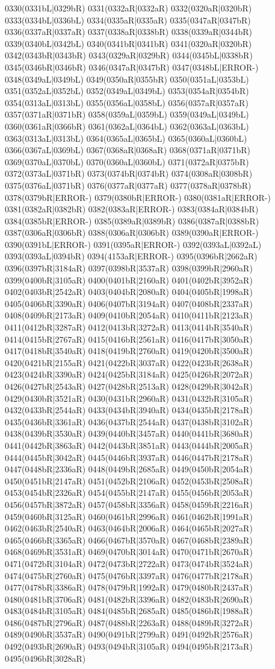 0330(0331bL|0329bR) 0331(0332aR|0332aR) 0332(0320aR|0320bR) 0333(0334bL|0336bL) 0334(0335aR|0335aR) 0335(0347aR|0347bR) 0336(0337aR|0337aR) 0337(0338aR|0338bR) 0338(0339aR|0344bR) 0339(0340bL|0342bL) 0340(0341bR|0341bR) 0341(0320aR|0320bR) 0342(0343bR|0343bR) 0343(0329aR|0329bR) 0344(0345bL|0338bR) 0345(0346bR|0346bR) 0346(0347aR|0347bR) 0347(0348bL|ERROR-) 0348(0349aL|0349bL) 0349(0350aR|0355bR) 0350(0351aL|0353bL) 0351(0352aL|0352bL) 0352(0349aL|0349bL) 0353(0354aR|0354bR) 0354(0313aL|0313bL) 0355(0356aL|0358bL) 0356(0357aR|0357aR) 0357(0371aR|0371bR) 0358(0359aL|0359bL) 0359(0349aL|0349bL) 0360(0361aR|0366bR) 0361(0362aL|0364bL) 0362(0363aL|0363bL) 0363(0313aL|0313bL) 0364(0365aL|0365bL) 0365(0360aL|0360bL) 0366(0367aL|0369bL) 0367(0368aR|0368aR) 0368(0371aR|0371bR) 0369(0370aL|0370bL) 0370(0360aL|0360bL) 0371(0372aR|0375bR) 0372(0373aL|0371bR) 0373(0374bR|0374bR) 0374(0308aR|0308bR) 0375(0376aL|0371bR) 0376(0377aR|0377aR) 0377(0378aR|0378bR) 0378(0379bR|ERROR-) 0379(0380bR|ERROR-) 0380(0381aR|ERROR-) 0381(0382aR|0382bR) 0382(0383aR|ERROR-) 0383(0384aR|0384bR) 0384(0385bR|ERROR-) 0385(0389aR|0389bR) 0386(0387aR|0388bR) 0387(0306aR|0306bR) 0388(0306aR|0306bR) 0389(0390aR|ERROR-) 0390(0391bL|ERROR-) 0391(0395aR|ERROR-) 0392(0393aL|0392aL) 0393(0393aL|0394bR) 0394(4153aR|ERROR-) 0395(0396bR|2662aR) 0396(0397bR|3184aR) 0397(0398bR|3537aR) 0398(0399bR|2960aR) 0399(0400bR|3105aR) 0400(0401bR|2160aR) 0401(0402bR|3952aR) 0402(0403bR|2542aR) 0403(0404bR|2080aR) 0404(0405bR|1998aR) 0405(0406bR|3390aR) 0406(0407bR|3194aR) 0407(0408bR|2337aR) 0408(0409bR|2173aR) 0409(0410bR|2054aR) 0410(0411bR|2123aR) 0411(0412bR|3287aR) 0412(0413bR|3272aR) 0413(0414bR|3540aR) 0414(0415bR|2767aR) 0415(0416bR|2561aR) 0416(0417bR|3050aR) 0417(0418bR|3540aR) 0418(0419bR|2760aR) 0419(0420bR|3500aR) 0420(0421bR|2155aR) 0421(0422bR|3037aR) 0422(0423bR|2638aR) 0423(0424bR|3390aR) 0424(0425bR|3184aR) 0425(0426bR|2072aR) 0426(0427bR|2543aR) 0427(0428bR|2513aR) 0428(0429bR|3042aR) 0429(0430bR|3521aR) 0430(0431bR|2960aR) 0431(0432bR|3105aR) 0432(0433bR|2544aR) 0433(0434bR|3940aR) 0434(0435bR|2178aR) 0435(0436bR|3361aR) 0436(0437bR|2544aR) 0437(0438bR|3102aR) 0438(0439bR|3530aR) 0439(0440bR|3457aR) 0440(0441bR|3680aR) 0441(0442bR|3863aR) 0442(0443bR|3851aR) 0443(0444bR|2005aR) 0444(0445bR|3042aR) 0445(0446bR|3937aR) 0446(0447bR|2178aR) 0447(0448bR|2336aR) 0448(0449bR|2685aR) 0449(0450bR|2054aR) 0450(0451bR|2147aR) 0451(0452bR|2106aR) 0452(0453bR|2508aR) 0453(0454bR|2326aR) 0454(0455bR|2147aR) 0455(0456bR|2053aR) 0456(0457bR|3872aR) 0457(0458bR|3356aR) 0458(0459bR|2216aR) 0459(0460bR|3125aR) 0460(0461bR|2996aR) 0461(0462bR|1991aR) 0462(0463bR|2540aR) 0463(0464bR|2006aR) 0464(0465bR|2027aR) 0465(0466bR|3365aR) 0466(0467bR|3570aR) 0467(0468bR|2389aR) 0468(0469bR|3531aR) 0469(0470bR|3014aR) 0470(0471bR|2670aR) 0471(0472bR|3104aR) 0472(0473bR|2722aR) 0473(0474bR|3524aR) 0474(0475bR|2760aR) 0475(0476bR|3397aR) 0476(0477bR|2178aR) 0477(0478bR|3386aR) 0478(0479bR|1992aR) 0479(0480bR|2437aR) 0480(0481bR|3706aR) 0481(0482bR|3396aR) 0482(0483bR|2690aR) 0483(0484bR|3105aR) 0484(0485bR|2685aR) 0485(0486bR|1988aR) 0486(0487bR|2796aR) 0487(0488bR|2263aR) 0488(0489bR|3272aR) 0489(0490bR|3537aR) 0490(0491bR|2799aR) 0491(0492bR|2576aR) 0492(0493bR|2690aR) 0493(0494bR|3105aR) 0494(0495bR|2173aR) 0495(0496bR|3028aR) 